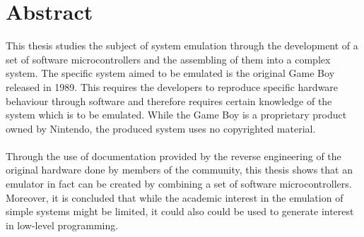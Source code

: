 
\thispagestyle{plain}			%
\setlength{\parskip}{0pt plus 1.0pt}
\section*{\centering Abstract}
This thesis studies the subject of system emulation through the development of a set of software microcontrollers and the assembling of them into a complex system. The specific system aimed to be emulated is the original Game Boy released in 1989. This requires the developers to reproduce specific hardware behaviour through software and therefore requires certain knowledge of the system which is to be emulated. While the Game Boy is a proprietary product owned by Nintendo, the produced system uses no copyrighted material. %
\\\\
Through the use of documentation provided by the reverse engineering of the original hardware done by members of the community, this thesis shows that an emulator in fact can be created by combining a set of software microcontrollers. Moreover, it is concluded that while the academic interest in the emulation of simple systems might be limited, it could also could be used to generate interest in low-level programming.


